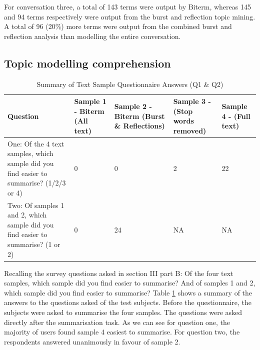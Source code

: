 For conversation three, a total of 143 terms were output by Biterm, whereas 145 and 94 terms respectively were output from the burst and reflection topic mining. A total of 96 (20\%) more terms were output from the combined burst and reflection analysis than modelling the entire conversation.

\subsection{Topic modelling comprehension}

\begin {table}[]
\caption {Summary of Text Sample Questionnaire Answers (Q1 \& Q2)} 
\label{tab:chapt7_study1_tab3}
\begin{center}
\begin{tabular}{| p{3.5cm} | p{2cm} | p{2cm} | p{2cm} | p{2cm} |} \hline \textbf{Question} & \textbf{Sample 1 - Biterm (All text)} & \textbf{Sample 2 - Biterm (Burst \& Reflections)} & \textbf{Sample 3 - (Stop words removed)} & \textbf{Sample 4 - (Full text)} 
\\ \hline One: Of the 4 text samples, which sample did you find easier to summarise? (1/2/3 or 4) & 0 & 0 & 2 & 22
\\ \hline Two:  Of samples 1 and 2, which sample did you find easier to summarise? (1 or 2) & 0 & 24 & NA & NA
\\ \hline
\end{tabular}
\end{center}
\end{table}

Recalling the survey questions asked in section III part B: Of the four text samples, which sample did you find easier to summarise? And of samples 1 and 2, which sample did you find easier to summarise?
Table \ref{tab:chapt7_study1_tab3} shows a summary of the answers to the questions asked of the test subjects. Before the questionnaire, the subjects were asked to summarise the four samples. The questions were asked directly after the summarisation task. As we can see for question one, the majority of users found sample 4 easiest to summarise. For question two, the respondents answered unanimously in favour of sample 2.

